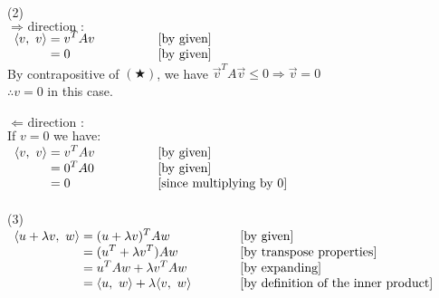 \documentclass[12pt]{article}
\begin{document}
\\\\
(2)\\ $\Longrightarrow \text{ direction :}$\\{$\begin{array}{r@{}>{\displaystyle}ll}
		\langle v, \ v \rangle & {}= v^T A v \qquad \qquad & [\text{by given}] \\
		                       & {}= 0                     & [\text{by given}] \\
	\end{array}$}\\
By contrapositive of $(\bigstar)$, we have $\vec{v}^T A\vec{v} \leq 0\Longrightarrow \vec{v} = 0 $\\
$\therefore v = 0$ in this case.
\\\\
$\Longleftarrow \text{ direction :}$\\
If $v = 0$ we have:\\
{$\begin{array}{r@{}>{\displaystyle}ll}
		\langle v, \ v \rangle & {}= v^T A v  \qquad \qquad & [\text{by given}]               \\
		                       & {}= 0^T A 0                & [\text{by given}]               \\
		                       & {}= 0                      & [\text{since multiplying by }0] \\
	\end{array}$}
\\\\ \newpage \noindent
(3)\\ {$\begin{array}{r@{}>{\displaystyle}ll}
		\langle u+\lambda v, \ w \rangle & {}= (u+\lambda v)^T A w                                                   & [\text{by given}]                           \\
		                                 & {}= (u^T+\lambda v^T) A w                                                 & [\text{by transpose properties}]            \\
		                                 & {}= u^T A w +\lambda v^T A w                                              & [\text{by expanding}]                       \\
		                                 & {}= \langle u, \ w \rangle + \lambda\langle v, \ w \rangle \hspace*{10mm} & [\text{by definition of the inner product}] \\
	\end{array}$}
\end{document}
